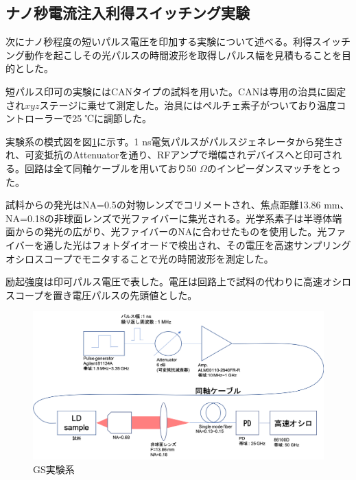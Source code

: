 \subsection{ナノ秒電流注入利得スイッチング実験}%
次にナノ秒程度の短いパルス電圧を印加する実験について述べる。利得スイッチング動作を起こしその光パルスの時間波形を取得しパルス幅を見積もることを目的とした。

短パルス印可の実験にはCANタイプの試料を用いた。CANは専用の治具に固定され$xyz$ステージに乗せて測定した。治具にはペルチェ素子がついており温度コントローラーで25 ℃に調節した。


実験系の模式図を図\ref{fig:fig_2_3_GS_setup}に示す。1 ns電気パルスがパルスジェネレータから発生され、可変抵抗のAttenuatorを通り、RFアンプで増幅されデバイスへと印可される。回路は全て同軸ケーブルを用いており50 $\Omega$のインピーダンスマッチをとった。

試料からの発光はNA=0.5の対物レンズでコリメートされ、焦点距離13.86 mm、NA=0.18の非球面レンズで光ファイバーに集光される。光学系素子は半導体端面からの発光の広がり、光ファイバーのNAに合わせたものを使用した。光ファイバーを通した光はフォトダイオードで検出され、その電圧を高速サンプリングオシロスコープでモニタすることで光の時間波形を測定した。

励起強度は印可パルス電圧で表した。電圧は回路上で試料の代わりに高速オシロスコープを置き電圧パルスの先頭値とした。
\begin{figure}[h]
	\includegraphics[width=15cm]{figure/fig_2_3_GS_setup.png}
	\caption{GS実験系}
	\label{fig:fig_2_3_GS_setup}
\end{figure}


